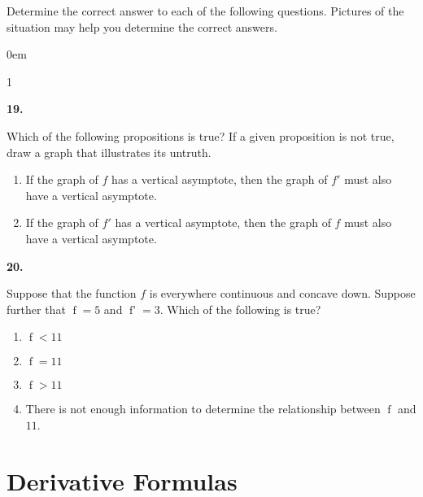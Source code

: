 \documentclass[12pt,]{book}
\newcommand{\lt}{<}
\newcommand{\gt}{>}
\theoremstyle{plain}
\theoremstyle{definition}
\numberwithin{equation}{section}
\newenvironment{exercisegroup}%
{\medskip\noindent}%
{\par\bigskip}%
\newlength{\exercisegroupindent}%
\newlength{\exercisegroupitemwidth}%
\newenvironment{exercisegrouplist}%
{\vspace{-\partopsep}%
\begin{adjustwidth}{\exercisegroupindent}{0em}}%
{\end{adjustwidth}%
\vspace{-\partopsep}%
\vspace{\baselineskip}}%
\newenvironment{exercisegroupbycol}[1]%
{\begin{exercisegrouplist}%
\vspace{-\multicolsep}%
\begin{multicols}{#1}%
\setlength{\parindent}{0em}%
\setlength{\exercisegroupitemwidth}{\linewidth}}%
{\end{multicols}%
\vspace{-\multicolsep}%
\end{exercisegrouplist}}%
\newenvironment{exercisegroupitem}[1]%
{\begin{minipage}[t]{\exercisegroupitemwidth}
\vspace{0pt}%
{\bfseries#1}%
\rule{0pt}{\baselineskip}}{\strut%
\end{minipage}%
\hspace{\columnsep}}%
\providecommand\phantomsection{}
\newcommand{\fe}[2]{\mathop{{#1}{\left(#2\right)}}}
\newcommand{\fd}[1]{#1'}
\begin{document}
\begin{exercisegroup}%
Determine the correct answer to each of the following questions.  Pictures of the situation may help you determine the correct answers.%
\par
\begin{exercisegroupbycol}{1}%
\begin{exercisegroupitem}{19. }\phantomsection\hypertarget{exercise-277}{\null}
Which of the following propositions is true? If a given proposition is not true, draw a graph that illustrates its untruth.%
\begin{enumerate}[label=(\alph*)]
\item{}If the graph of \(f\) has a vertical asymptote, then the graph of \(\fd{f}\) must also have a vertical asymptote.\item{}If the graph of \(\fd{f}\) has a vertical asymptote, then the graph of \(f\) must also have a vertical asymptote.\end{enumerate}
\end{exercisegroupitem}%
\par%
\begin{exercisegroupitem}{20. }\phantomsection\hypertarget{exercise-278}{\null}
Suppose that the function \(f\) is everywhere continuous and concave down.  Suppose further that \(\fe{f}{7}=5\) and \(\fe{\fd{f}}{7}=3\).  Which of the following is true?%
\begin{enumerate}[label=(\alph*)]
\item{}\(\fe{f}{9}\lt11\)\item{}\(\fe{f}{9}=11\)\item{}\(\fe{f}{9}\gt11\)\item{}There is not enough information to determine the relationship between \(\fe{f}{9}\) and \(11\).\end{enumerate}
\end{exercisegroupitem}%
\par%
\end{exercisegroupbycol}%
\end{exercisegroup}%
\typeout{************************************************}
\typeout{************************************************}
\chapter[Derivative Formulas]{Derivative Formulas}\label{chapter-derivative-formulas}
\typeout{************************************************}
\typeout{************************************************}
\end{document}
